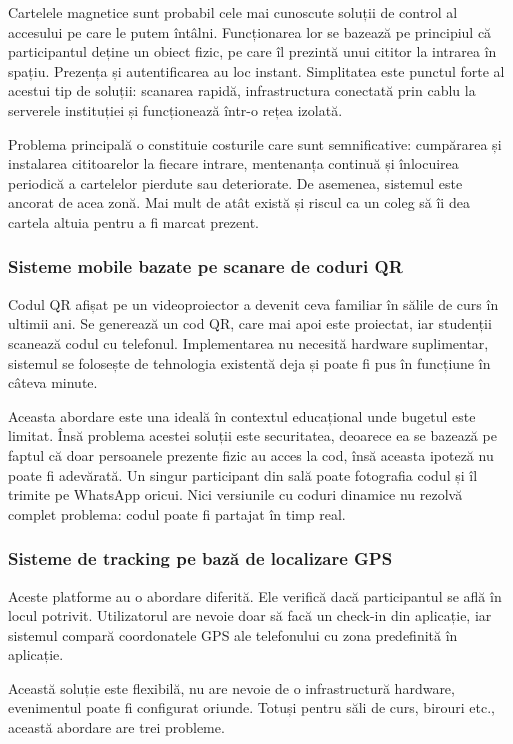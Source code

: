 \documentclass[11pt]{article}
\begin{document}
Cartelele magnetice sunt probabil cele mai cunoscute soluții de control al accesului pe care le putem întâlni. Funcționarea lor se bazează pe principiul că participantul deține un obiect fizic, pe care îl prezintă unui cititor la intrarea în spațiu. Prezența și autentificarea au loc instant. Simplitatea este punctul forte al acestui tip de soluții: scanarea rapidă, infrastructura conectată prin cablu la serverele instituției și funcționează într-o rețea izolată.

Problema principală o constituie costurile care sunt semnificative: cumpărarea și instalarea cititoarelor la fiecare intrare, mentenanța continuă și înlocuirea periodică a cartelelor pierdute sau deteriorate. De asemenea, sistemul este ancorat de acea zonă. Mai mult de atât există și riscul ca un coleg să îi dea cartela altuia pentru a fi marcat prezent.

\subsubsection{Sisteme mobile bazate pe scanare de coduri QR}
Codul QR afișat pe un videoproiector a devenit ceva familiar în sălile de curs în ultimii ani. Se generează un cod QR, care mai apoi este proiectat, iar studenții scanează codul cu telefonul.
Implementarea nu necesită hardware suplimentar, sistemul se folosește de tehnologia existentă deja și poate fi pus în funcțiune în câteva minute.

Aceasta abordare este una ideală în contextul educațional unde bugetul este limitat. Însă problema acestei soluții este securitatea, deoarece ea se bazează pe faptul că doar persoanele prezente fizic au acces la cod, însă aceasta ipoteză nu poate fi adevărată. Un singur participant din sală poate fotografia codul și îl trimite pe WhatsApp oricui. Nici versiunile cu coduri dinamice nu rezolvă complet problema: codul poate fi partajat în timp real.
\subsubsection{Sisteme de tracking pe bază de localizare GPS}
Aceste platforme au o abordare diferită. Ele verifică dacă participantul se află în locul potrivit. Utilizatorul are nevoie doar să facă un check-in din aplicație, iar sistemul compară coordonatele GPS ale telefonului cu zona predefinită în aplicație.

Această soluție este flexibilă, nu are nevoie de o infrastructură hardware, evenimentul poate fi configurat oriunde. Totuși pentru săli de curs, birouri etc., această abordare are trei probleme.
\end{document}
